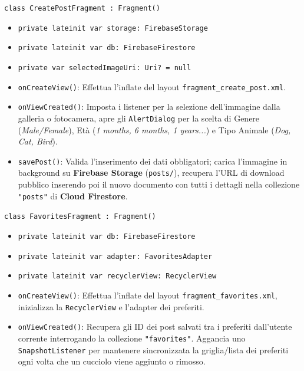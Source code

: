 \documentclass[a4paper]{report}
\begin{document}
\texttt{class CreatePostFragment : Fragment()}
\begin{itemize}
    \item \texttt{private lateinit var storage: FirebaseStorage}
    \item \texttt{private lateinit var db: FirebaseFirestore}
    \item \texttt{private var selectedImageUri: Uri? = null}
    \item \texttt{onCreateView()}: Effettua l'inflate del layout \texttt{fragment\_create\_post.xml}.
    \item \texttt{onViewCreated()}: Imposta i listener per la selezione dell'immagine dalla galleria o fotocamera, apre gli \texttt{AlertDialog} per la scelta di Genere (\textit{Male/Female}), Età (\textit{1 months, 6 months, 1 years...}) e Tipo Animale (\textit{Dog, Cat, Bird}).
    \item \texttt{savePost()}: Valida l'inserimento dei dati obbligatori; carica l'immagine in background su \textbf{Firebase Storage} (\texttt{posts/}), recupera l'URL di download pubblico inserendo poi il nuovo documento con tutti i dettagli nella collezione \texttt{"posts"} di \textbf{Cloud Firestore}.
\end{itemize}

\texttt{class FavoritesFragment : Fragment()}
\begin{itemize}
    \item \texttt{private lateinit var db: FirebaseFirestore}
    \item \texttt{private lateinit var adapter: FavoritesAdapter}
    \item \texttt{private lateinit var recyclerView: RecyclerView}
    \item \texttt{onCreateView()}: Effettua l'inflate del layout \texttt{fragment\_favorites.xml}, inizializza la \texttt{RecyclerView} e l'adapter dei preferiti.
    \item \texttt{onViewCreated()}: Recupera gli ID dei post salvati tra i preferiti dall'utente corrente interrogando la collezione \texttt{"favorites"}. Aggancia uno \texttt{SnapshotListener} per mantenere sincronizzata la griglia/lista dei preferiti ogni volta che un cucciolo viene aggiunto o rimosso.
\end{itemize}
\end{document}
